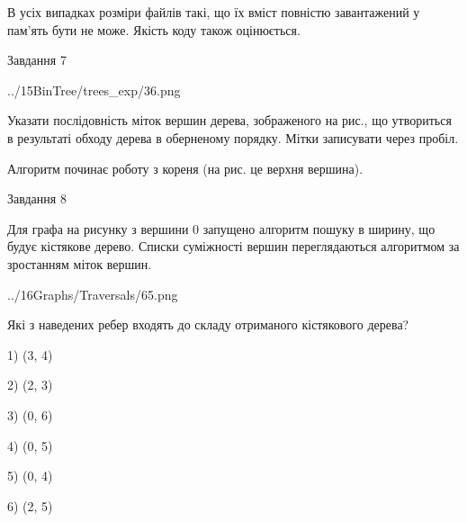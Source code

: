 \documentclass[12pt, ukrainian]{article}
\begin{document}
{В усіх випадках розміри файлів такі, що їх вміст повністю завантажений у пам'ять бути не може. Якість коду також оцінюється.



\vspace{10mm}\par

\newpage
\begin{minipage}[t]{9.7cm}
               
{\begin{center}Завдання {7}\end{center}}
\vspace{-4mm}

\begin{center}
	{../15BinTree/trees_exp/36.png}
\end{center}
Указати послідовність міток вершин дерева, зображеного на рис., що утвориться в результаті обходу дерева в оберненому порядку. Мітки записувати через пробіл.\par Алгоритм починає роботу з кореня (на рис. це верхня вершина).\par

\end{minipage}
\vline \hspace{8mm}
\begin{minipage}[t]{8.0cm}
               
{\begin{center}Завдання {8}\end{center}}
\vspace{-4mm}
Для графа на рисунку з вершини 0 запущено алгоритм пошуку в ширину, що будує кістякове дерево. Списки суміжності вершин переглядаються алгоритмом за зростанням міток вершин.\par
\begin{center}
	{../16Graphs/Traversals/65.png}
\end{center}
\par Які з наведених ребер входять до складу отриманого кістякового дерева?\par
1) (3, 4)\par
2) (2, 3)\par
3) (0, 6)\par
4) (0, 5)\par
5) (0, 4)\par
6) (2, 5)\par
{\vskip 15pt} \par


\end{minipage}}
\end{document}
